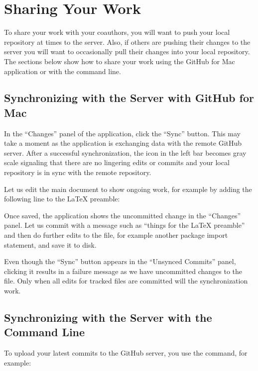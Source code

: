 \section{Sharing Your Work} \label{sec:sharing}

To share your work with your coauthors, you will want to push your local repository at times to the server.  Also, if others are pushing their changes to the server you will want to occasionally pull their changes into your local repository.  The sections below show how to share your work using the GitHub for Mac application or with the command line.

\subsection{Synchronizing with the Server with GitHub for Mac}

In the ``Changes'' panel of the application, click the ``Sync'' button.  This may take a moment as the application is exchanging data with the remote GitHub server.  After a successful synchronization, the icon in the left bar becomes gray scale signaling that there are no lingering edits or commits and your local repository is in sync with the remote repository.

Let us edit the main document to show ongoing work, for example by adding the following line to the LaTeX preamble:
\begin{FileVerbatim}
\usepackage{url} %
\end{FileVerbatim}
Once saved, the application shows the uncommitted change in the ``Changes'' panel.  Let us commit with a message such as ``things for the LaTeX preamble'' and then do further edits to the file, for example another package import statement, and save it to disk.
\begin{FileVerbatim}
\usepackage{color}
\end{FileVerbatim}
Even though the ``Sync'' button appears in the ``Unsynced Commits'' panel, clicking it results in a failure message as we have uncommitted changes to the file.  Only when all edits for tracked files are committed will the synchronization work.

\subsection{Synchronizing with the Server with the Command Line}

To upload your latest commits to the GitHub server, you use the  command, for example:

